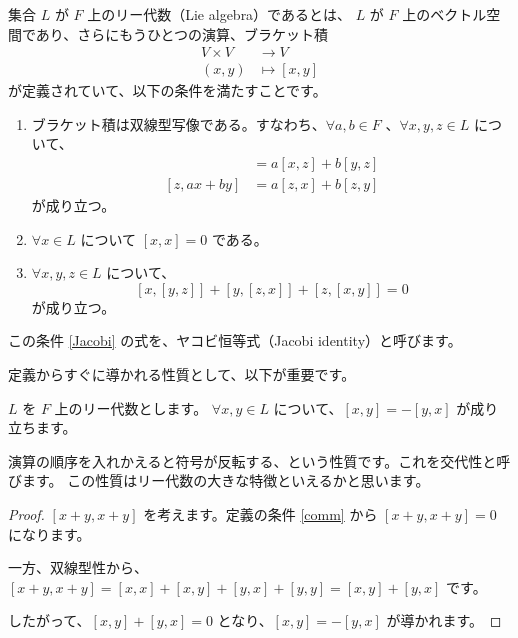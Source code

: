 \documentclass{ltjsarticle}
\begin{document}
\begin{definition}[リー代数]
    集合 \(L\) が \(F\) 上のリー代数（Lie algebra）であるとは、
    \(L\) が \(F\) 上のベクトル空間であり、さらにもうひとつの演算、ブラケット積
    \begin{align*}
        V \times V & \to V          \\
        (x, y)     & \mapsto [x, y]
    \end{align*}
    が定義されていて、以下の条件を満たすことです。
    \begin{enumerate}
        \item ブラケット積は双線型写像である。すなわち、\(\forall a, b \in F\) 、\(\forall x, y, z \in L\) について、
              \begin{align*}
                  [ax + by, z] & = a[x, z] + b[y, z] \\
                  [z, ax + by] & = a[z, x] + b[z, y]
              \end{align*}
              が成り立つ。
        \item\label{comm} \(\forall x \in L\) について \([x, x] = 0\) である。
        \item\label{Jacobi} \(\forall x, y, z \in L\) について、
              \[
                  [x, [y, z]] + [y, [z, x]] + [z, [x, y]] = 0
              \]
              が成り立つ。
    \end{enumerate}
\end{definition}

この条件 \ref{Jacobi} の式を、ヤコビ恒等式（Jacobi identity）と呼びます。

定義からすぐに導かれる性質として、以下が重要です。

\begin{proposition}[交代性]
    \(L\) を \(F\) 上のリー代数とします。
    \(\forall x, y\in L\) について、\([x, y] = -[y, x]\) が成り立ちます。
\end{proposition}

演算の順序を入れかえると符号が反転する、という性質です。これを交代性と呼びます。
この性質はリー代数の大きな特徴といえるかと思います。

\begin{proof}
    \([x + y, x + y]\) を考えます。定義の条件 \ref{comm} から \([x + y, x + y] = 0\) になります。

    一方、双線型性から、\([x + y, x + y] = [x, x] + [x, y] + [y, x] + [y, y] = [x, y] + [y, x]\) です。

    したがって、\([x, y] + [y, x] = 0\) となり、\([x, y] = -[y, x]\) が導かれます。
\end{proof}
\end{document}
